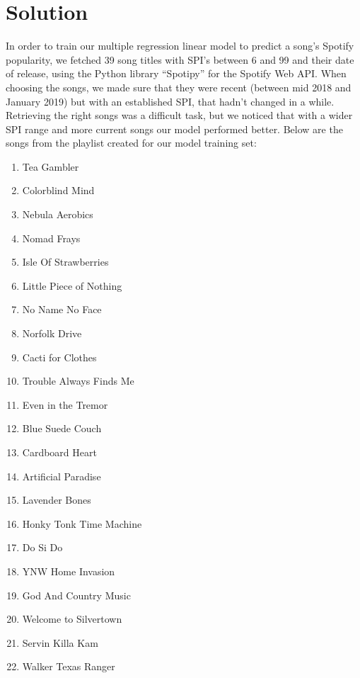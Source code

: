 \documentclass[12pt,conference]{IEEEtran}
\begin{document}
\section{Solution}
In order to train our multiple regression linear model to predict a song's Spotify popularity, we fetched 39 song titles with SPI's between 6 and 99 and their date of release, using the Python library ``Spotipy'' for the Spotify Web API. When choosing the songs, we made sure that they were recent (between mid 2018 and January 2019) but with an established SPI, that hadn't changed in a while. Retrieving the right songs was a difficult task, but we noticed that with a wider SPI range and more current songs our model performed better. Below are the songs from the playlist created for our model training set:
\begin{enumerate}
    \item Tea Gambler                     
    \item Colorblind Mind                 
    \item Nebula Aerobics                 
    \item Nomad Frays                     
    \item Isle Of Strawberries            
    \item Little Piece of Nothing         
    \item No Name No Face                 
    \item Norfolk Drive                   
    \item Cacti for Clothes               
    \item Trouble Always Finds Me         
    \item Even in the Tremor              
    \item Blue Suede Couch                
    \item Cardboard Heart                 
    \item Artificial Paradise             
    \item Lavender Bones                  
    \item Honky Tonk Time Machine         
    \item Do Si Do                        
    \item YNW Home Invasion               
    \item God And Country Music           
    \item Welcome to Silvertown           
    \item Servin Killa Kam                
    \item Walker Texas Ranger             

\end{enumerate}
\end{document}
